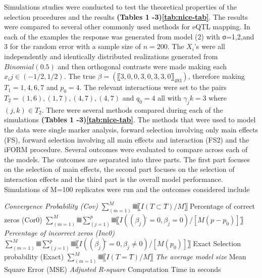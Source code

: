 \documentclass[11pt,]{book}
\theoremstyle{definition}
\theoremstyle{definition}
\theoremstyle{remark}
\begin{document}
Simulations studies were conducted to test the theoretical properties of
the selection procedures and the results \textbf{(Tables 1
-3)\ref{tab:nice-tab}}. The results were compared to several other
commonly used methods for eQTL mapping. In each of the examples the
response was generated from model (2) with σ=1,2,and 3 for the random
error with a sample size of \(n=200\). The \(X_i\)'s were all
independently and identically distributed realizations generated from
\(Binomial(0.5)\) and then orthogonal contrasts were made making each
\(x_ij∈(-1/2,1/2)\). The true \(β=(〖3,0,0,3,0,3,3,0〗_493)\), therefore
making \(T_1={1,4,6,7}\) and \(p_0=4\). The relevant interactions were
set to the pairs \(T_2={(1,6),(1,7),(4,7),(4,7)}\) and \(q_0=4\) all
with \(γ_jk=3\) where \((j,k)∈T_2\). There were several methods compared
during each of the simulations \textbf{(Tables 1 -3)\ref{tab:nice-tab}}.
The methods that were used to model the data were single marker
analysis, forward selection involving only main effects (FS), forward
selection involving all main effects and interaction (FS2) and the iFORM
procedure. Several outcomes were evaluated to compare across each of the
models. The outcomes are separated into three parts. The first part
focuses on the selection of main effects, the second part focuses on the
selection of interaction effects and the third part is the overall model
performance. Simulations of M=100 replicates were run and the outcomes
considered include

\emph{Convergence Probability (Cov) \(∑_(m=1)^M▒〖I(T⊂T ̂ )/M〗\)
}Percentage of correct zeros (Cor0)
\(∑_(m=1)^M▒∑_(j=1)^p▒〖I((β_j ) ̂=0,β_j=0)/[M(p-p_0)]〗\)
\emph{Percentage of incorrect zeros (Inc0)
\(∑_(m=1)^M▒∑_(j=1)^p▒〖I((β_j ) ̂=0,β_j≠0)/[M(p_0)]〗\) }Exact Selection
probability (Exact) \(∑_(m=1)^M▒〖I(T=T ̂ )/M 〗\) \emph{The average
model size }Mean Square Error (MSE) \emph{Adjusted R-square }Computation
Time in seconds
\end{document}
